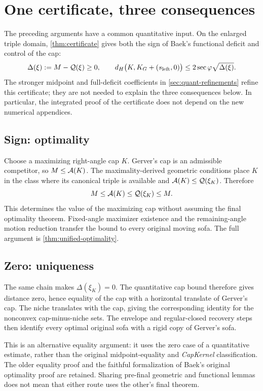 \section{One certificate, three consequences}\label{sec:quant-certificate-overview}

The preceding arguments have a common quantitative input. On the enlarged
triple domain, \cref{thm:certificate} gives both the sign of Baek's functional
deficit and control of the cap:
\[
 \Delta(\xi):=M-\mathcal{Q}(\xi)\ge0,
 \qquad
 d_H\bigl(K,K_G+(s_{\mathrm{left}},0)\bigr)
 \le2\sec\varphi\sqrt{\Delta(\xi)}.
\]
The stronger midpoint and full-deficit coefficients in
\cref{sec:quant-refinements} refine this certificate; they are not needed to
explain the three consequences below. In particular, the integrated proof
of the certificate does not depend on the new numerical appendices.

\subsection{Sign: optimality}

Choose a maximizing right-angle cap $K$. Gerver's cap is an admissible
competitor, so $M\le\mathcal{A}(K)$. The maximality-derived geometric conditions
place $K$ in the class where its canonical triple is available and
$\mathcal{A}(K)\le\mathcal{Q}(\xi_K)$. Therefore
\[
 M\le\mathcal{A}(K)\le\mathcal{Q}(\xi_K)\le M.
\]
This determines the value of the maximizing cap without assuming the final
optimality theorem. Fixed-angle maximizer existence and the remaining-angle
motion reduction transfer the bound to every original moving sofa. The full
argument is \cref{thm:unified-optimality}.

\subsection{Zero: uniqueness}

The same chain makes $\Delta(\xi_K)=0$. The quantitative cap bound therefore
gives distance zero, hence equality of the cap with a horizontal translate
of Gerver's cap. The niche translates with the cap, giving the corresponding
identity for the nonconvex cap-minus-niche sets. The envelope and
regular-closed recovery steps then identify every optimal original sofa
with a rigid copy of Gerver's sofa.

This is an alternative equality argument: it uses the zero case of a
quantitative estimate, rather than the original midpoint-equality and
\emph{CapKernel} classification. The older equality proof and the faithful
formalization of Baek's original optimality proof are retained. Sharing
pre-final geometric and functional lemmas does not mean that either route
uses the other's final theorem.

